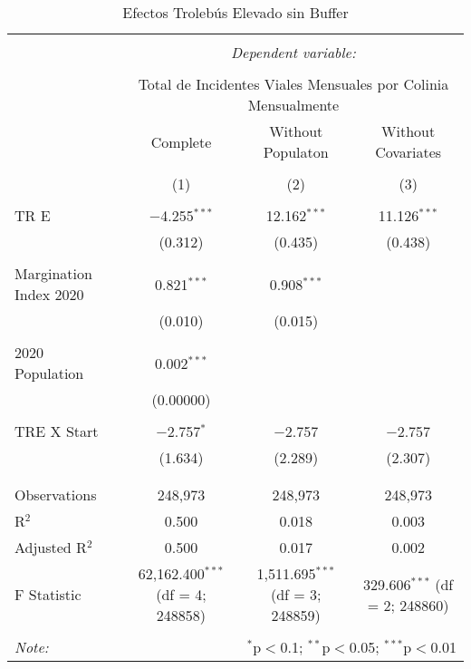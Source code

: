 
\begin{table}[!htbp] \centering 
  \caption{Efectos Trolebús Elevado sin Buffer} 
  \label{} 
\begin{tabular}{@{\extracolsep{5pt}}lccc} 
\\[-1.8ex]\hline 
\hline \\[-1.8ex] 
 & \multicolumn{3}{c}{\textit{Dependent variable:}} \\ 
\cline{2-4} 
\\[-1.8ex] & \multicolumn{3}{c}{Total de Incidentes Viales Mensuales por Colinia Mensualmente} \\ 
 & Complete & Without Populaton & Without Covariates \\ 
\\[-1.8ex] & (1) & (2) & (3)\\ 
\hline \\[-1.8ex] 
 TR E & $-$4.255$^{***}$ & 12.162$^{***}$ & 11.126$^{***}$ \\ 
  & (0.312) & (0.435) & (0.438) \\ 
  & & & \\ 
 Margination Index 2020 & 0.821$^{***}$ & 0.908$^{***}$ &  \\ 
  & (0.010) & (0.015) &  \\ 
  & & & \\ 
 2020 Population & 0.002$^{***}$ &  &  \\ 
  & (0.00000) &  &  \\ 
  & & & \\ 
 TRE X Start & $-$2.757$^{*}$ & $-$2.757 & $-$2.757 \\ 
  & (1.634) & (2.289) & (2.307) \\ 
  & & & \\ 
\hline \\[-1.8ex] 
Observations & 248,973 & 248,973 & 248,973 \\ 
R$^{2}$ & 0.500 & 0.018 & 0.003 \\ 
Adjusted R$^{2}$ & 0.500 & 0.017 & 0.002 \\ 
F Statistic & 62,162.400$^{***}$ (df = 4; 248858) & 1,511.695$^{***}$ (df = 3; 248859) & 329.606$^{***}$ (df = 2; 248860) \\ 
\hline 
\hline \\[-1.8ex] 
\textit{Note:}  & \multicolumn{3}{r}{$^{*}$p$<$0.1; $^{**}$p$<$0.05; $^{***}$p$<$0.01} \\ 
\end{tabular} 
\end{table} 

